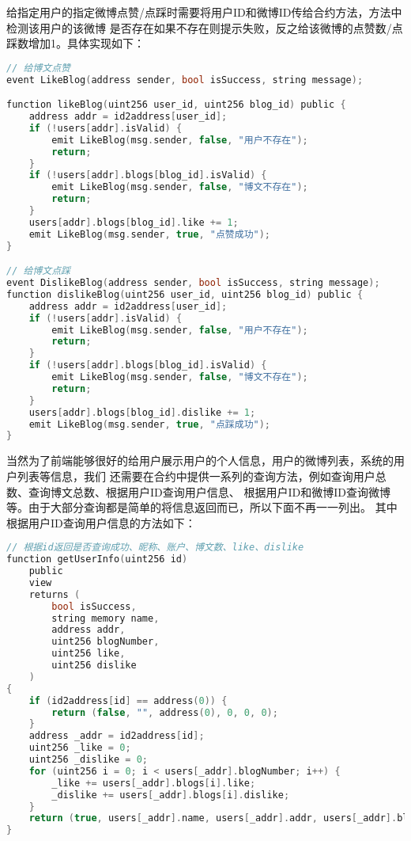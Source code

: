 \documentclass[bwprint]{hfutreport}
\begin{document}
给指定用户的指定微博点赞/点踩时需要将用户ID和微博ID传给合约方法，方法中检测该用户的该微博
是否存在如果不存在则提示失败，反之给该微博的点赞数/点踩数增加1。具体实现如下：
\begin{lstlisting}[language=c]
// 给博文点赞
event LikeBlog(address sender, bool isSuccess, string message);

function likeBlog(uint256 user_id, uint256 blog_id) public {
    address addr = id2address[user_id];
    if (!users[addr].isValid) {
        emit LikeBlog(msg.sender, false, "用户不存在");
        return;
    }
    if (!users[addr].blogs[blog_id].isValid) {
        emit LikeBlog(msg.sender, false, "博文不存在");
        return;
    }
    users[addr].blogs[blog_id].like += 1;
    emit LikeBlog(msg.sender, true, "点赞成功");
}

// 给博文点踩
event DislikeBlog(address sender, bool isSuccess, string message);
function dislikeBlog(uint256 user_id, uint256 blog_id) public {
    address addr = id2address[user_id];
    if (!users[addr].isValid) {
        emit LikeBlog(msg.sender, false, "用户不存在");
        return;
    }
    if (!users[addr].blogs[blog_id].isValid) {
        emit LikeBlog(msg.sender, false, "博文不存在");
        return;
    }
    users[addr].blogs[blog_id].dislike += 1;
    emit LikeBlog(msg.sender, true, "点踩成功");
}
\end{lstlisting}

当然为了前端能够很好的给用户展示用户的个人信息，用户的微博列表，系统的用户列表等信息，我们
还需要在合约中提供一系列的查询方法，例如查询用户总数、查询博文总数、根据用户ID查询用户信息、
根据用户ID和微博ID查询微博等。由于大部分查询都是简单的将信息返回而已，所以下面不再一一列出。
其中根据用户ID查询用户信息的方法如下：
\begin{lstlisting}[language=c]
// 根据id返回是否查询成功、昵称、账户、博文数、like、dislike
function getUserInfo(uint256 id)
    public
    view
    returns (
        bool isSuccess,
        string memory name,
        address addr,
        uint256 blogNumber,
        uint256 like,
        uint256 dislike
    )
{
    if (id2address[id] == address(0)) {
        return (false, "", address(0), 0, 0, 0);
    }
    address _addr = id2address[id];
    uint256 _like = 0;
    uint256 _dislike = 0;
    for (uint256 i = 0; i < users[_addr].blogNumber; i++) {
        _like += users[_addr].blogs[i].like;
        _dislike += users[_addr].blogs[i].dislike;
    }
    return (true, users[_addr].name, users[_addr].addr, users[_addr].blogNumber, _like, _dislike);
}
\end{lstlisting}
\end{document}
